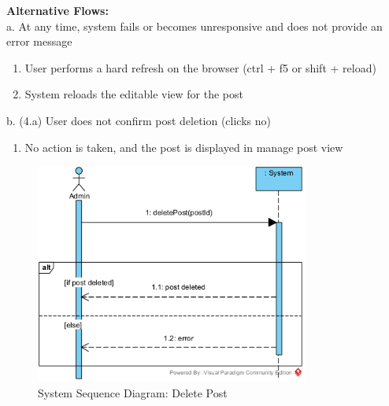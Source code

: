 \documentclass{article}
\begin{document}
\textbf{Alternative Flows: } \\
a. At any time, system fails or becomes unresponsive and does not provide an error message
\begin{enumerate}
    \item User performs a hard refresh on the browser (ctrl + f5 or shift + reload)
    \item System reloads the editable view for the post
\end{enumerate}
b. (4.a) User does not confirm post deletion (clicks no)
\begin{enumerate}
    \item No action is taken, and the post is displayed in manage post view
\end{enumerate}

\begin{figure}[H]
    \centering
    \includegraphics[width=0.8\textwidth]{images/SSD-UC12-DeletePost.png}
    \centering
    \caption{System Sequence Diagram: Delete Post}
\end{figure}
\end{document}
